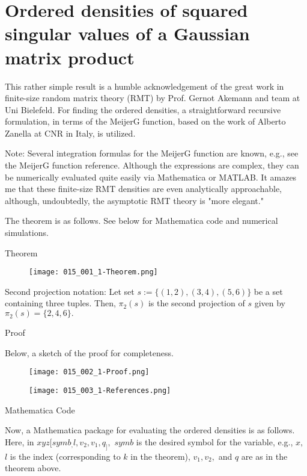 \section{Ordered densities of squared singular values of a Gaussian matrix product}

This rather simple result is a humble acknowledgement of the great work in finite-size random matrix theory (RMT) by Prof. Gernot Akemann and team at Uni Bielefeld. For finding the ordered densities, a straightforward recursive formulation, in terms of the MeijerG function, based on the work of Alberto Zanella at CNR in Italy, is utilized.

Note: Several integration formulas for the MeijerG function are known, e.g., see the MeijerG function reference.
Although the expressions are complex, they can be numerically evaluated quite easily via Mathematica or MATLAB. It amazes me that these finite-size RMT densities are even analytically approachable, although, undoubtedly, the asymptotic RMT theory is "more elegant."

The theorem is as follows. See below for Mathematica code and numerical simulations.

Theorem

\begin{figure}[H]
	\centering
	\texttt{[image: 015\_001\_1-Theorem.png]}
\end{figure}

Second projection notation: Let set $s := \{(1,2), (3,4), (5,6)\}$ be a set containing three tuples. Then, $\pi_2(s)$ is the second projection of $s$ given by $\pi_2(s) = \{2, 4, 6\}.$

Proof

Below, a sketch of the proof for completeness.

\begin{figure}[H]
	\centering
	\texttt{[image: 015\_002\_1-Proof.png]}
\end{figure}
\begin{figure}[H]
	\centering
	\texttt{[image: 015\_003\_1-References.png]}
\end{figure}

Mathematica Code

Now, a Mathematica package for evaluating the ordered densities is as follows. Here, in $xyz[symb_, l, v_2, v_1, q_],$ $symb$ is the desired symbol for the variable, e.g., $x,$ $l$ is the index (corresponding to $k$ in the theorem), $v_1, v_2,$ and $q$ are as in the theorem above.

